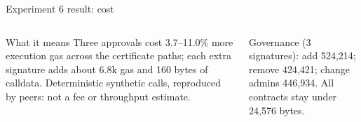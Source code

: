\documentclass[aspectratio=169,10pt]{beamer}
\begin{document}
\begin{frame}{Experiment 6 result: cost}
\vspace{0.5em}
\begin{columns}[T,onlytextwidth]
\begin{alertblock}{What it means}
\scriptsize Three approvals cost 3.7--11.0\% more execution gas across the certificate paths; each extra signature adds about 6.8k gas and 160 bytes of calldata. Deterministic synthetic calls, reproduced by peers: not a fee or throughput estimate.
\end{alertblock}
\scriptsize\color{datagray}
Governance (3 signatures): add 524,214; remove 424,421; change admins 446,934. All contracts stay under 24,576 bytes.\\[3pt]
\end{columns}
\end{frame}
\end{document}
